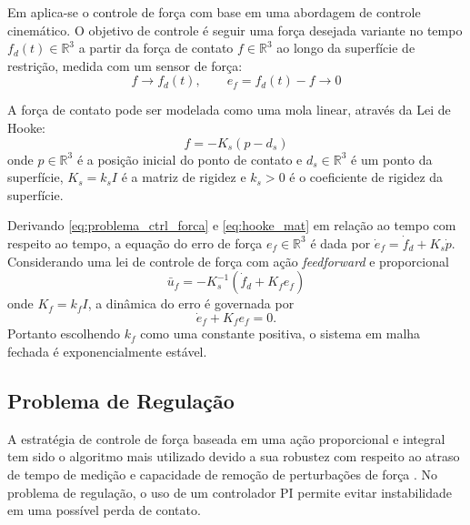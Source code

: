 Em \citep{leite2011servo} aplica-se o controle de força com base em uma abordagem de controle cinemático. O objetivo de controle é seguir uma força desejada variante no tempo ${f}_d(t) \in \mathbb{R}^3$ a partir da força de contato ${f} \in \mathbb{R}^3$ ao longo da superfície de restrição, medida com um sensor de força:
\begin{equation} \label{eq:problema_ctrl_forca}
{f} \rightarrow {f}_d(t), \qquad {e}_f = {f}_d(t) - {f} \rightarrow 0
\end{equation}

A força de contato pode ser modelada como uma mola linear, através da Lei de Hooke:
\begin{equation} \label{eq:hooke_mat}
{f} = -{K}_s ({p} - {d}_s)
\end{equation}
onde ${p} \in \mathbb{R}^3$ é a posição inicial do ponto de contato e ${d}_s \in \mathbb{R}^3$ é um ponto da superfície, ${K}_s = k_s I$ é a matriz de rigidez e $k_s > 0$ é o coeficiente de rigidez da superfície.

Derivando \eqref{eq:problema_ctrl_forca} e \eqref{eq:hooke_mat} em relação ao tempo com respeito ao tempo, a equação do erro de força $e_f \in \mathbb{R}^3$ é dada por $\dot{{e}}_f = \dot{{f}}_d + {K}_s \dot{{p}}$. Considerando uma lei de controle de força com ação \textit{feedforward} e proporcional
\begin{equation}
{\bar{u}}_f = -{K}_s^{-1} (\dot{{f}}_d + {K}_f {e}_f)
\end{equation}
onde ${K}_f = k_f {I}$, a dinâmica do erro é governada por
\begin{equation}
\dot{{e}}_f + {K}_f {e}_f = 0.
\end{equation}
Portanto escolhendo $k_f$ como uma constante positiva, o sistema em malha fechada é exponencialmente estável. 

\subsection{Problema de Regulação}

A estratégia de controle de força baseada em uma ação proporcional e integral tem sido o algoritmo mais utilizado devido a sua robustez com respeito ao atraso de tempo de medição e capacidade de remoção de perturbações de força \citep{wilfinger1994integral}. No problema de regulação, o uso de um controlador PI permite evitar instabilidade em uma possível perda de contato.

